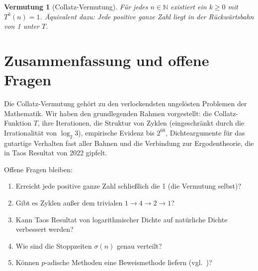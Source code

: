 \documentclass[12pt,a4paper]{article}
\newtheorem{conjecture}[theorem]{Vermutung}
\begin{document}
\begin{conjecture}[Collatz-Vermutung]\label{conj:collatz}
Für jedes $n \in \mathbb{N}$ existiert ein $k \geq 0$ mit $T^k(n) = 1$.
Äquivalent dazu: Jede positive ganze Zahl liegt in der Rückwärtsbahn von 1 unter $T$.
\end{conjecture}

\section{Zusammenfassung und offene Fragen}

Die Collatz-Vermutung gehört zu den verlockendsten ungelösten Problemen der Mathematik.
Wir haben den grundlegenden Rahmen vorgestellt: die Collatz-Funktion $T$, ihre Iterationen,
die Struktur von Zyklen (eingeschränkt durch die Irrationalität von $\log_2 3$), empirische
Evidenz bis $2^{68}$, Dichteargumente für das gutartige Verhalten fast aller Bahnen und die
Verbindung zur Ergodentheorie, die in Taos Resultat von 2022 gipfelt.

Offene Fragen bleiben:
\begin{enumerate}
  \item Erreicht jede positive ganze Zahl schließlich die 1 (die Vermutung selbst)?
  \item Gibt es Zyklen außer dem trivialen $1 \to 4 \to 2 \to 1$?
  \item Kann Taos Resultat von logarithmischer Dichte auf natürliche Dichte verbessert werden?
  \item Wie sind die Stoppzeiten $\sigma(n)$ genau verteilt?
  \item Können $p$-adische Methoden eine Beweismethode liefern (vgl.\ \cite{Fuhrmann2026b})?
\end{enumerate}
\end{document}
